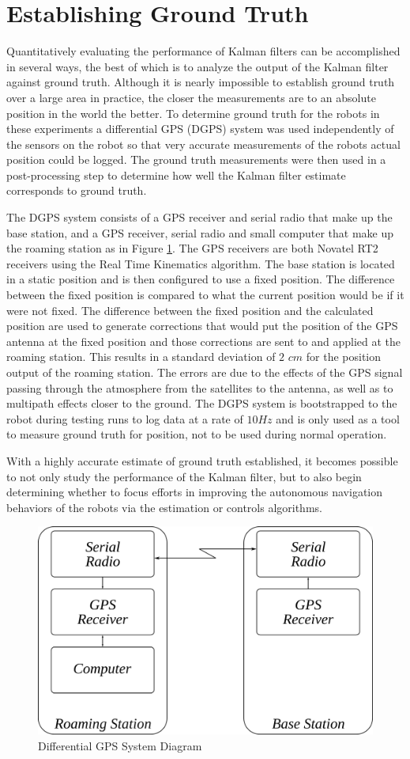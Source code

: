 \section{Establishing Ground Truth}
\label{sec:groundtruth}
Quantitatively evaluating the performance of Kalman filters can be accomplished in several ways, the best of which is to analyze the output of the Kalman filter against ground truth. Although it is nearly impossible to establish ground truth over a large area in practice, the closer the measurements are to an absolute position in the world the better. To determine ground truth for the robots in these experiments a differential GPS (DGPS) system was used independently of the sensors on the robot so that very accurate measurements of the robots actual position could be logged. The ground truth measurements were then used in a post-processing step to determine how well the Kalman filter estimate corresponds to ground truth.

The DGPS system consists of a GPS receiver and serial radio that make up the base station, and a GPS receiver, serial radio and small computer that make up the roaming station as in Figure \ref{fig:dgps}. The GPS receivers are both Novatel RT2 receivers using the Real Time Kinematics algorithm. The base station is located in a static position and is then configured to use a fixed position. The difference between the fixed position is compared to what the current position would be if it were not fixed. The difference between the fixed position and the calculated position are used to generate corrections that would put the position of the GPS antenna at the fixed position and those corrections are sent to and applied at the roaming station. This results in a standard deviation of $2$ $cm$ for the position output of the roaming station. The errors are due to the effects of the GPS signal passing through the atmosphere from the satellites to the antenna, as well as to multipath effects closer to the ground. The DGPS system is bootstrapped to the robot during testing runs to log data at a rate of $10 Hz$ and is only used as a tool to measure ground truth for position, not to be used during normal operation.

With a highly accurate estimate of ground truth established, it becomes possible to not only study the performance of the Kalman filter, but to also begin determining whether to focus efforts in improving the autonomous navigation behaviors of the robots via the estimation or controls algorithms.

\begin{figure}[ht!]
	\centering
	\includegraphics[width=.6\textwidth]{images/dgps}
	\caption{Differential GPS System Diagram}
	\label{fig:dgps}
\end{figure}

